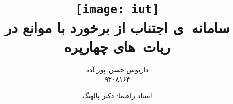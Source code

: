 \title{
    \texttt{[image: iut]}\\\vspace{20pt}
  سامانه\ ی اجتناب از برخورد با موانع در ربات\ های چهارپره\\
}
\author{
داریوش حسن\ پور آده\\
۹۳۰۸۱۶۴
}
\date{استاد راهنما: دکتر پالهنگ}
\maketitle